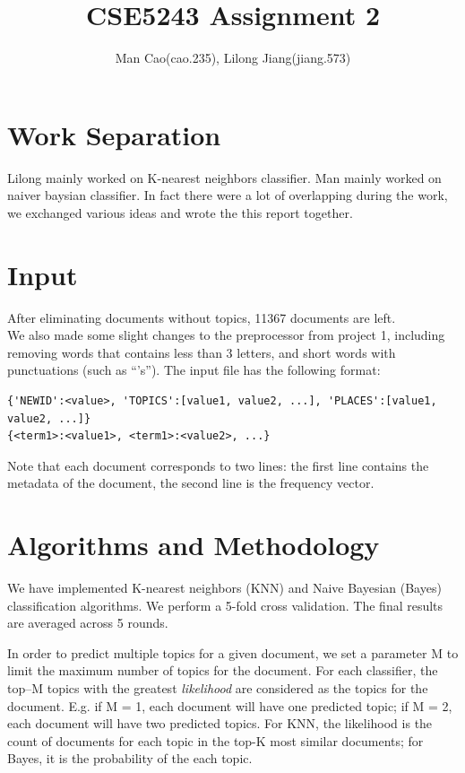 \documentclass{article}
\begin{document}
\title{CSE5243 Assignment 2}
\author{Man Cao(cao.235), Lilong Jiang(jiang.573)}
\maketitle

\section{Work Separation}
Lilong mainly worked on K-nearest neighbors classifier. Man mainly worked on naiver baysian classifier. In fact there were a lot of overlapping during the work, we exchanged various ideas and wrote the this report together.
\section{Input}
After eliminating documents without topics, 11367 documents are left.\\
We also made some slight changes to the preprocessor from project 1, including removing words that contains less than 3 letters, and short words with punctuations (such as ``'s''). 
The input file has the following format:
\begin{verbatim}
{'NEWID':<value>, 'TOPICS':[value1, value2, ...], 'PLACES':[value1, value2, ...]}
{<term1>:<value1>, <term1>:<value2>, ...}
\end{verbatim}
Note that each document corresponds to two lines: the first line contains the
metadata of the document, the second line is the frequency vector.

\section{Algorithms and Methodology}
We have implemented K-nearest neighbors (KNN) and Naive Bayesian (Bayes) classification algorithms.
We perform a 5-fold cross validation. The final results are averaged across 5
rounds.

In order to predict multiple topics for a given document, we set a parameter M
to limit the maximum number of topics for the document.
For each classifier, the top--M topics with the greatest \emph{likelihood} are
considered as the topics for the document. E.g. if M = 1, each document will
have one predicted topic; if M = 2, each document will have two predicted topics.
For KNN, the likelihood is the count of documents for each topic in the top-K most similar documents;
for Bayes, it is the probability of the each topic.
\end{document}

